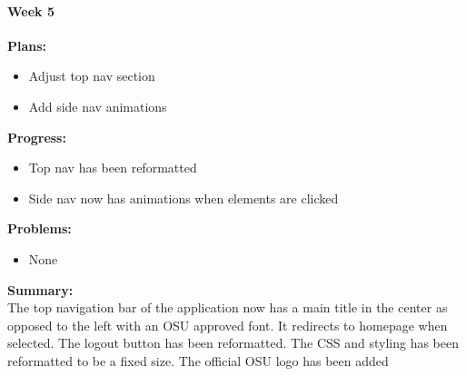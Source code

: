 \paragraph{Week 5}
\begin{adjustwidth}{2.5em}{0pt}
    \vspace{-0.5cm}\textbf{Plans:}
    \vspace{-0.5cm}
    \begin{itemize}
        \item Adjust top nav section
        \item Add side nav animations
    \end{itemize} 
    \vspace{-0.3cm}\textbf{Progress:}
    \vspace{-0.5cm}
    \begin{itemize}
        \item Top nav has been reformatted
        \item Side nav now has animations when elements are clicked
    \end{itemize} 
    \vspace{-0.3cm}\textbf{Problems:}
    \vspace{-0.5cm}
    \begin{itemize}
        \item None
    \end{itemize}  
    \vspace{-0.3cm}\noindent\textbf{Summary:}\\
    \noindent The top navigation bar of the application now has a main title in the center as opposed to the left with an OSU approved font. It redirects to homepage when selected. The logout button has been reformatted. The CSS and styling has been reformatted to be a fixed size. The official OSU logo has been added
	\end{adjustwidth} 
